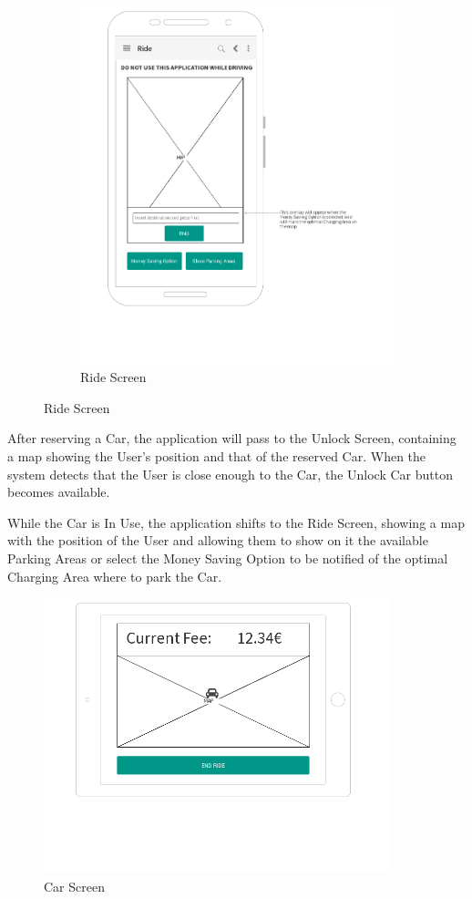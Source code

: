 \documentclass[12pt]{article}
\begin{document}
\begin{figure}[h!]
\begin{subfigure}[b]{0.64\textwidth}
        \includegraphics[width=\textwidth]{../UI/RideScreen}
        \caption{Ride Screen}
    \end{subfigure}
\end{figure}
After reserving a Car, the application will pass to the Unlock Screen, containing a map showing the User's position and that of the reserved Car. When the system detects that the User is close enough to the Car, the Unlock Car button becomes available.

While the Car is In Use, the application shifts to the Ride Screen, showing a map with the position of the User and allowing them to show on it the available Parking Areas or select the Money Saving Option to be notified of the optimal Charging Area where to park the Car. \clearpage

\begin{figure}[h!]
	\centering
	\includegraphics[width=0.9\textwidth]{../UI/CarScreen}
	\caption{Car Screen}
\end{figure}
\end{document}
